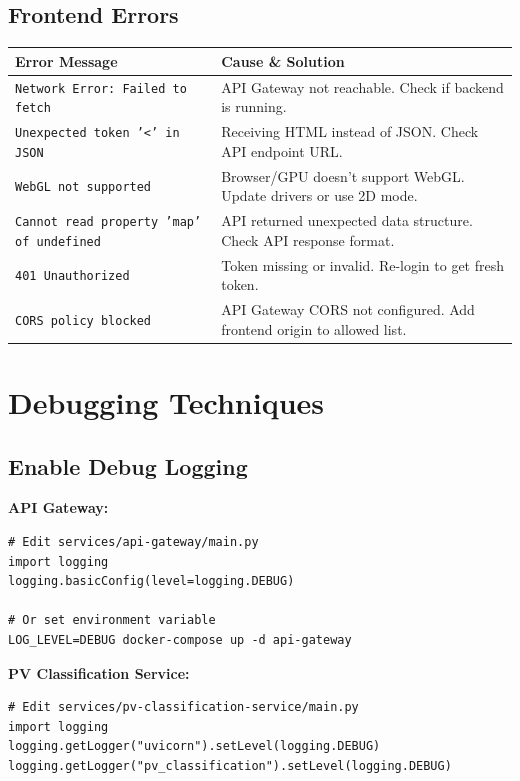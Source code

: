 \subsection{Frontend Errors}

\begin{table}[h]
\centering
\caption{Common Frontend Error Messages}
\begin{longtable}{p{}p{}}
\toprule
\textbf{Error Message} & \textbf{Cause \& Solution} \\
\midrule
\texttt{Network Error: Failed to fetch} & 
API Gateway not reachable. Check if backend is running. \\
\addlinespace
\texttt{Unexpected token '<' in JSON} & 
Receiving HTML instead of JSON. Check API endpoint URL. \\
\addlinespace
\texttt{WebGL not supported} & 
Browser/GPU doesn't support WebGL. Update drivers or use 2D mode. \\
\addlinespace
\texttt{Cannot read property 'map' of undefined} & 
API returned unexpected data structure. Check API response format. \\
\addlinespace
\texttt{401 Unauthorized} & 
Token missing or invalid. Re-login to get fresh token. \\
\addlinespace
\texttt{CORS policy blocked} & 
API Gateway CORS not configured. Add frontend origin to allowed list. \\
\bottomrule
\end{longtable}
\end{table}

\section{Debugging Techniques}

\subsection{Enable Debug Logging}

\textbf{API Gateway:}
\begin{lstlisting}[style=pythonstyle]
# Edit services/api-gateway/main.py
import logging
logging.basicConfig(level=logging.DEBUG)

# Or set environment variable
LOG_LEVEL=DEBUG docker-compose up -d api-gateway
\end{lstlisting}

\textbf{PV Classification Service:}
\begin{lstlisting}[style=pythonstyle]
# Edit services/pv-classification-service/main.py
import logging
logging.getLogger("uvicorn").setLevel(logging.DEBUG)
logging.getLogger("pv_classification").setLevel(logging.DEBUG)
\end{lstlisting}

